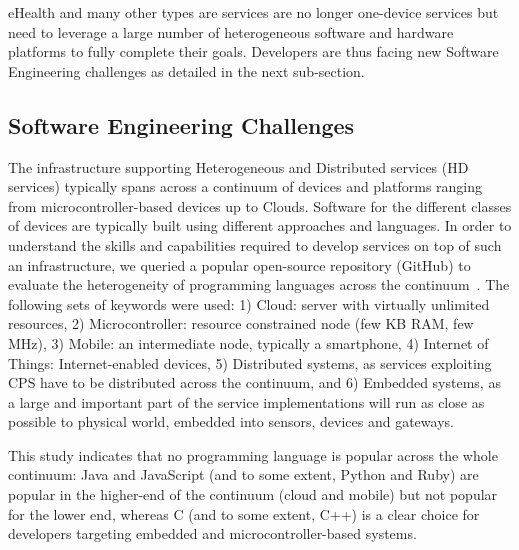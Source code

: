 eHealth and many other types are services are no longer one-device services but need to leverage a large number of heterogeneous software and hardware platforms to fully complete their goals. Developers are thus facing new Software Engineering challenges as detailed in the next sub-section. 

\subsection{Software Engineering Challenges}

The infrastructure supporting Heterogeneous and Distributed services (HD services) typically spans across a continuum of devices and platforms ranging from microcontroller-based devices up to Clouds. Software for the different classes of devices are typically built using different approaches and languages. In order to understand the skills and capabilities required to develop services on top of such an infrastructure, we queried a popular open-source repository (GitHub) to evaluate the heterogeneity of programming languages across the continuum~\cite{DBLP:conf/icse/MorinFB15}. The following sets of keywords were used: 1) Cloud: server with virtually unlimited resources, 2) Microcontroller: resource constrained node (few KB RAM, few MHz), 3) Mobile: an intermediate node, typically a smartphone, 4) Internet of Things: Internet-enabled devices, 5) Distributed systems, as services exploiting CPS have to be distributed across the continuum, and 6) Embedded systems, as a large and important part of the service implementations will run as close as possible to physical world, embedded into sensors, devices and gateways. 

This study indicates that no programming language is popular across the whole continuum: Java and JavaScript (and to some extent, Python and Ruby) are popular in the higher-end of the continuum (cloud and mobile) but not popular for the lower end, whereas C (and to some extent, C++) is a clear choice for developers targeting embedded and microcontroller-based systems.%

